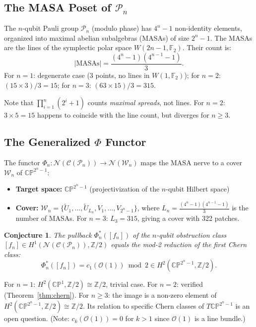 \documentclass[11pt,a4paper]{article}
\newtheorem{conjecture}[theorem]{Conjecture}
\theoremstyle{remark}
\newcommand{\CP}{\mathbb{CP}}
\newcommand{\Z}{\mathbb{Z}}
\newcommand{\cO}{\mathcal{O}}
\newcommand{\cC}{\mathcal{C}}
\newcommand{\cN}{\mathcal{N}}
\newcommand{\cW}{\mathcal{W}}
\newcommand{\PP}{\mathcal{P}}
\begin{document}
\subsection{The MASA Poset of $\PP_n$}

The $n$-qubit Pauli group $\PP_n$ (modulo phase) has $4^n - 1$
non-identity elements, organized into maximal abelian subalgebras (MASAs)
of size $2^n - 1$. The MASAs are the lines of the symplectic polar space
$W(2n-1, \mathbb{F}_2)$. Their count is:
\[
|\text{MASAs}| = \frac{(4^n - 1)(4^{n-1} - 1)}{3}.
\]
For $n=1$: degenerate case (3 points, no lines in $W(1,\mathbb{F}_2)$);
for $n=2$: $(15 \times 3)/3 = 15$;
for $n=3$: $(63 \times 15)/3 = 315$.

Note that $\prod_{i=1}^n (2^i + 1)$ counts \emph{maximal spreads}, not
lines. For $n=2$: $3 \times 5 = 15$ happens to coincide with the line
count, but diverges for $n \geq 3$.

\subsection{The Generalized $\Phi$ Functor}

The functor $\Phi_n: \cN(\cC(\PP_n)) \to \cN(\cW_n)$ maps the MASA nerve
to a cover $\cW_n$ of $\CP^{2^n - 1}$:
\begin{itemize}
  \item \textbf{Target space:} $\CP^{2^n - 1}$ (projectivization of the
    $n$-qubit Hilbert space)
  \item \textbf{Cover:} $\cW_n = \{\tilde{U}_1, \dots, \tilde{U}_{L_n},
    V_1, \dots, V_{2^n-1}\}$, where
    $L_n = \frac{(4^n - 1)(4^{n-1} - 1)}{3}$ is the number of MASAs.
    For $n=3$: $L_3 = 315$, giving a cover with 322 patches.
\end{itemize}

\begin{conjecture}
\label{conj:nqubit}
The pullback $\Phi_n^*([f_n])$ of the $n$-qubit obstruction class
$[f_n] \in H^1(\cN(\cC(\PP_n)), \Z/2)$ equals the mod-2 reduction of the
first Chern class:
\[
\Phi_n^*([f_n]) = c_1(\cO(1)) \bmod 2 \in H^2(\CP^{2^n - 1}, \Z/2).
\]
\end{conjecture}

For $n=1$: $H^2(\CP^1, \Z/2) \cong \Z/2$, trivial case.
For $n=2$: verified (Theorem~\ref{thm:chern}).
For $n \geq 3$: the image is a non-zero element of
$H^2(\CP^{2^n-1}, \Z/2) \cong \Z/2$. Its relation to specific Chern
classes of $T\CP^{2^n-1}$ is an open question. (Note:
$c_k(\cO(1)) = 0$ for $k > 1$ since $\cO(1)$ is a line bundle.)
\end{document}
